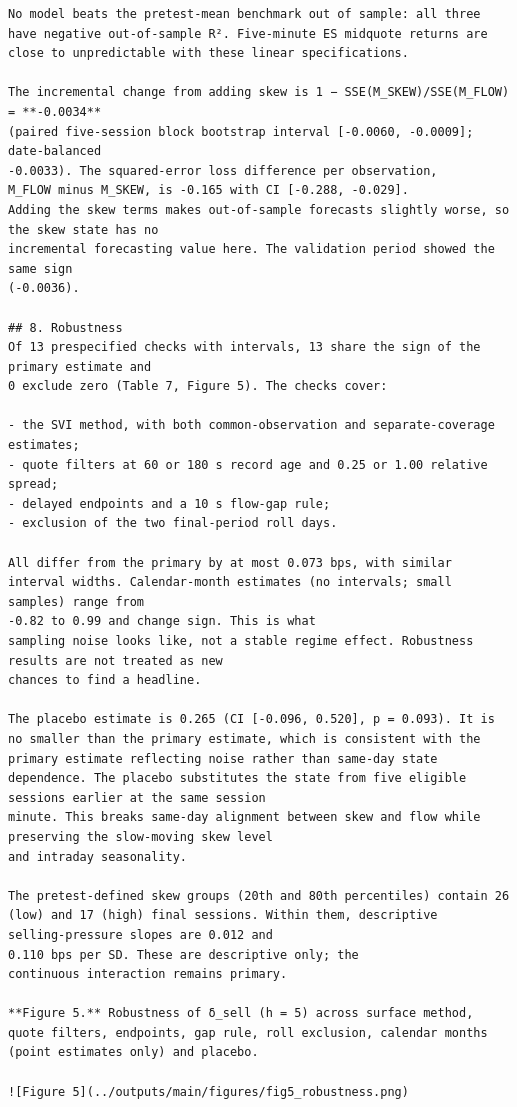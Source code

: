 \documentclass[11pt]{article}
\begin{document}
\begin{verbatim}
No model beats the pretest-mean benchmark out of sample: all three have negative out-of-sample R². Five-minute ES midquote returns are close to unpredictable with these linear specifications.

The incremental change from adding skew is 1 − SSE(M_SKEW)/SSE(M_FLOW) = **-0.0034**
(paired five-session block bootstrap interval [-0.0060, -0.0009]; date-balanced
-0.0033). The squared-error loss difference per observation,
M_FLOW minus M_SKEW, is -0.165 with CI [-0.288, -0.029].
Adding the skew terms makes out-of-sample forecasts slightly worse, so the skew state has no
incremental forecasting value here. The validation period showed the same sign
(-0.0036).

## 8. Robustness
Of 13 prespecified checks with intervals, 13 share the sign of the primary estimate and
0 exclude zero (Table 7, Figure 5). The checks cover:

- the SVI method, with both common-observation and separate-coverage estimates;
- quote filters at 60 or 180 s record age and 0.25 or 1.00 relative spread;
- delayed endpoints and a 10 s flow-gap rule;
- exclusion of the two final-period roll days.

All differ from the primary by at most 0.073 bps, with similar interval widths. Calendar-month estimates (no intervals; small samples) range from
-0.82 to 0.99 and change sign. This is what
sampling noise looks like, not a stable regime effect. Robustness results are not treated as new
chances to find a headline.

The placebo estimate is 0.265 (CI [-0.096, 0.520], p = 0.093). It is no smaller than the primary estimate, which is consistent with the primary estimate reflecting noise rather than same-day state dependence. The placebo substitutes the state from five eligible sessions earlier at the same session
minute. This breaks same-day alignment between skew and flow while preserving the slow-moving skew level
and intraday seasonality.

The pretest-defined skew groups (20th and 80th percentiles) contain 26
(low) and 17 (high) final sessions. Within them, descriptive
selling-pressure slopes are 0.012 and
0.110 bps per SD. These are descriptive only; the
continuous interaction remains primary.

**Figure 5.** Robustness of δ_sell (h = 5) across surface method, quote filters, endpoints, gap rule, roll exclusion, calendar months (point estimates only) and placebo.

![Figure 5](../outputs/main/figures/fig5_robustness.png)



\end{verbatim}
\end{document}
